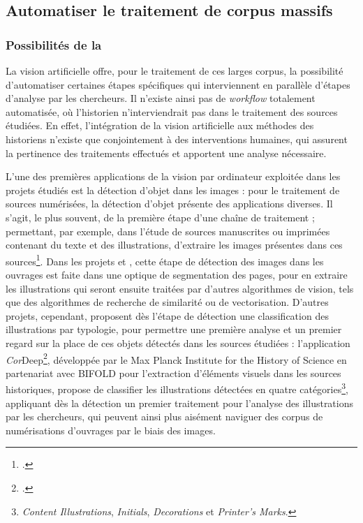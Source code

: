     \subsection{Automatiser le traitement de corpus massifs}
        \subsubsection{Possibilités de la \cv}
La vision artificielle offre, pour le traitement de ces larges corpus, la possibilité d'automatiser certaines étapes spécifiques qui interviennent en parallèle d'étapes d'analyse par les chercheurs. Il n'existe ainsi pas de \textit{workflow} totalement automatisée, où l'historien n'interviendrait pas dans le traitement des sources étudiées. En effet, l'intégration de la vision artificielle aux méthodes des historiens n'existe que conjointement à des interventions humaines, qui assurent la pertinence des traitements effectués et apportent une analyse nécessaire.

L'une des premières applications de la vision par ordinateur exploitée dans les projets étudiés est la détection d'objet dans les images : pour le traitement de sources numérisées, la détection d'objet présente des applications diverses. Il s'agit, le plus souvent, de la première étape d'une chaîne de traitement ; permettant, par exemple, dans l'étude de sources manuscrites ou imprimées contenant du texte et des illustrations, d'extraire les images présentes dans ces sources\footcite{buttnerCorDeepSacroboscoDataset2022}. Dans les projets \eida et \vhs, cette étape de détection des images dans les ouvrages est faite dans une optique de segmentation des pages, pour en extraire les illustrations qui seront ensuite traitées par d'autres algorithmes de vision, tels que des algorithmes de recherche de similarité ou de vectorisation. D'autres projets, cependant, proposent dès l'étape de détection une classification des illustrations par typologie, pour permettre une première analyse et un premier regard sur la place de ces objets détectés dans les sources étudiées : l'application \textit{Cor}Deep\footcite{CorDeep}, développée par le Max Planck Institute for the History of Science en partenariat avec BIFOLD pour l'extraction d'éléments visuels dans les sources historiques, propose de classifier les illustrations détectées en quatre catégories\footnote{\textit{Content Illustrations}, \textit{Initials}, \textit{Decorations} et \textit{Printer's Marks}.}, appliquant dès la détection un premier traitement pour l'analyse des illustrations par les chercheurs, qui peuvent ainsi plus aisément naviguer des corpus de numérisations d'ouvrages par le biais des images.

